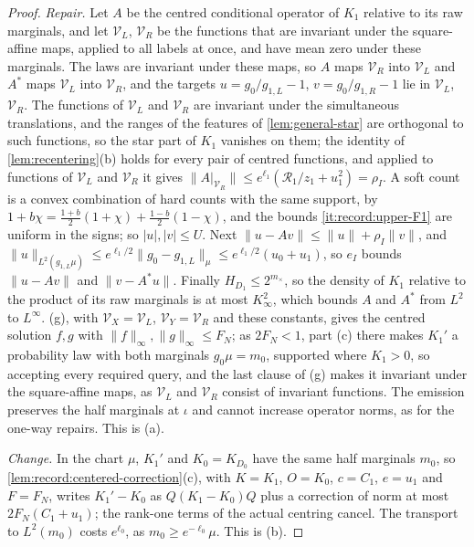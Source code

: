 \begin{proof}
\emph{Repair.} Let $A$ be the centred conditional operator of $K_1$ relative to its
raw marginals, and let $\mathcal V_L$, $\mathcal V_R$ be the functions that are
invariant under the square-affine maps, applied to all labels at once, and have
mean zero under these marginals. The laws are invariant under these maps, so $A$
maps $\mathcal V_R$ into $\mathcal V_L$ and $A^*$ maps $\mathcal V_L$ into $\mathcal V_R$,
and the targets $u=g_0/g_{1,L}-1$, $v=g_0/g_{1,R}-1$ lie in $\mathcal V_L$,
$\mathcal V_R$. The functions of $\mathcal V_L$ and $\mathcal V_R$ are invariant under
the simultaneous translations, and the ranges of the features of
\cref{lem:general-star} are orthogonal to such functions, so the star part of
$K_1$ vanishes on them; the identity of \cref{lem:recentering}(b) holds for every
pair of centred functions, and applied to functions of $\mathcal V_L$ and
$\mathcal V_R$ it gives $\|A|_{\mathcal V_R}\|\le e^{\ell_1}(\mathcal R_1/z_1+u_1^2)=\rho_I$. A soft
count is a convex combination of hard counts with the same support, by
$1+b\chi=\frac{1+b}2(1+\chi)+\frac{1-b}2(1-\chi)$, and the bounds
\ref{it:record:upper-F1} are uniform in the signs; so $|u|,|v|\le U$. Next
$\|u-Av\|\le\|u\|+\rho_I\|v\|$, and
$\|u\|_{L^2(g_{1,L}\mu)}\le e^{\ell_1/2}\|g_0-g_{1,L}\|_\mu\le e^{\ell_1/2}(u_0+u_1)$, so
$e_I$ bounds $\|u-Av\|$ and $\|v-A^*u\|$. Finally $H_{D_1}\le2^{m_\times}$, so the
density of $K_1$ relative to the product of its raw marginals is at most
$K_\infty^2$, which bounds $A$ and $A^*$ from $L^2$ to $L^\infty$.
(g), with $\mathcal V_X=\mathcal V_L$, $\mathcal V_Y=\mathcal V_R$
and these constants, gives the centred solution $f,g$ with
$\|f\|_\infty,\|g\|_\infty\le F_N$; as $2F_N<1$, part (c) there makes $K_1'$ a
probability law with both marginals $g_0\mu=m_0$, supported where $K_1>0$, so
accepting every required query, and the last clause of (g) makes it invariant
under the square-affine maps, as $\mathcal V_L$ and $\mathcal V_R$ consist of
invariant functions. The emission preserves the half
marginals at $\iota$ and cannot increase operator norms, as for the one-way
repairs. This is (a).

\emph{Change.} In the chart $\mu$, $K_1'$ and $K_0=K_{D_0}$ have the same half
marginals $m_0$, so \cref{lem:record:centered-correction}(c), with $K=K_1$, $O=K_0$,
$c=C_1$, $e=u_1$ and $F=F_N$, writes $K_1'-K_0$ as $Q(K_1-K_0)Q$ plus a correction
of norm at most $2F_N(C_1+u_1)$; the rank-one terms of the actual centring cancel.
The transport to $L^2(m_0)$ costs $e^{\ell_0}$, as $m_0\ge e^{-\ell_0}\mu$. This is
(b).


\end{proof}
